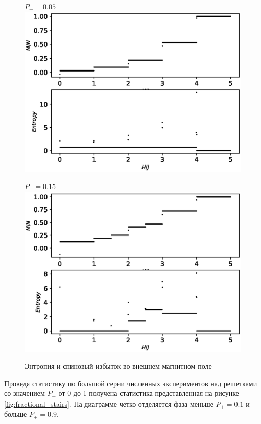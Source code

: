 \documentclass[utf8, babel, sor, jor, amsmath, amssymb, reprint]{elsarticle} %
\begin{document}
\begin{figure}[H]
	\begin{minipage}[h]{0.45\linewidth}
		\centering $P_+ = 0.05$
		\includegraphics[width=1\linewidth]{images/Entopy_and_se_P0.05.eps}
	\end{minipage}
	\hfill
	\begin{minipage}[h]{0.45\linewidth}
		\centering $P_+ = 0.15$
		\includegraphics[width=1\linewidth]{images/Entopy_and_se_P0.15.eps}
	\end{minipage}
	\caption{Энтропия и спиновый избыток во внешнем магнитном поле}
	\label{fig:entropy_sp_acros_AFM}
\end{figure}

Проведя статистику по большой серии численных экспериментов над решетками со значением $P_+$ от 0 до 1 получена статистика представленная на рисунке \ref{fig:fractional_stairs}. На диаграмме четко отделяется фаза меньше $P_+ = 0.1$ и больше $P_+ = 0.9$.
\end{document}
